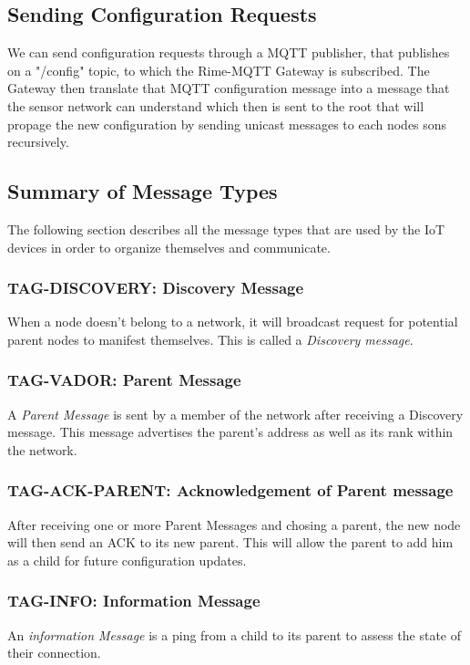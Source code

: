 \documentclass[a4paper,11pt]{article}
\begin{document}
\subsection{Sending Configuration Requests}
We can send configuration requests through a MQTT publisher, that publishes on a "/config" topic, to which the Rime-MQTT Gateway is subscribed. The Gateway then translate that MQTT configuration message into a message that the sensor network can understand which then is sent to the root that will propage the new configuration by sending unicast messages to each nodes sons recursively.

\subsection{Summary of Message Types}
The following section describes all the message types that are used by the IoT devices in order to organize themselves and communicate.

\subsubsection{TAG-DISCOVERY: Discovery Message}
When a node doesn't belong to a network, it will broadcast request for potential parent nodes to manifest themselves. This is called a \textit{Discovery message}.

\subsubsection{TAG-VADOR: Parent Message}
A \textit{Parent Message} is sent by a member of the network after receiving a Discovery message. This message advertises the parent's address as well as its rank within the network.

\subsubsection{TAG-ACK-PARENT: Acknowledgement of Parent message}
After receiving one or more Parent Messages and chosing a parent, the new node will then send an ACK to its new parent. This will allow the parent to add him as a child for future configuration updates.

\subsubsection{TAG-INFO: Information Message}
An \textit{information Message} is a ping from a child to its parent to assess the state of their connection.
\end{document}
